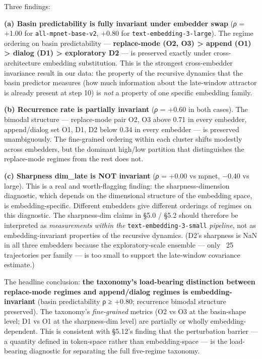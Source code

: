 \documentclass{article}
\theoremstyle{plain}
\theoremstyle{definition}
\begin{document}
Three findings:

\textbf{(a) Basin predictability is fully invariant under embedder swap}
(\textit{ρ} = +1.00 for \texttt{all-mpnet-base-v2}, +0.80 for
\texttt{text-embedding-3-large}). The regime ordering on basin predictability
— \textbf{replace-mode (O2, O3) > append (O1) > dialog (D1) > exploratory
D2} — is preserved exactly under cross-architecture embedding
substitution. This is the strongest cross-embedder invariance result
in our data: the property of the recursive dynamics that the basin
predictor measures (how much information about the late-window
attractor is already present at step 10) is \textit{not} a property of one
specific embedding family.

\textbf{(b) Recurrence rate is partially invariant} (\textit{ρ} = +0.60 in both
cases). The bimodal structure — replace-mode pair {O2, O3} above
0.71 in every embedder, append/dialog set {O1, D1, D2} below 0.34
in every embedder — is preserved unambiguously. The fine-grained
ordering within each cluster shifts modestly across embedders, but
the dominant high/low partition that distinguishes the replace-mode
regimes from the rest does not.

\textbf{(c) Sharpness dim\_late is NOT invariant} (\textit{ρ} = +0.00 vs mpnet,
−0.40 vs large). This is a real and worth-flagging finding: the
sharpness-dimension diagnostic, which depends on the dimensional
structure of the embedding space, is embedding-specific. Different
embedders give different orderings of regimes on this diagnostic.
The sharpness-dim claims in §5.0 / §5.2 should therefore be
interpreted as \textit{measurements within the} \texttt{text-embedding-3-small}
\textit{pipeline}, not as embedding-invariant properties of the recursive
dynamics. (D2's sharpness is NaN in all three embedders because the
exploratory-scale ensemble — only ~25 trajectories per family — is
too small to support the late-window covariance estimate.)

The headline conclusion: \textbf{the taxonomy's load-bearing distinction
between replace-mode regimes and append/dialog regimes is
embedding-invariant} (basin predictability ρ ≥ +0.80; recurrence
bimodal structure preserved). The taxonomy's \textit{fine-grained} metrics
(O2 vs O3 at the basin-shape level; D1 vs O1 at the sharpness-dim
level) are partially or wholly embedding-dependent. This is consistent
with §5.12's finding that the perturbation barrier — a quantity
defined in token-space rather than embedding-space — is the
load-bearing diagnostic for separating the full five-regime
taxonomy.
\end{document}
